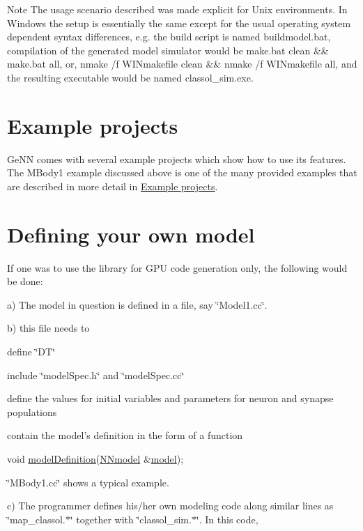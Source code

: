 \begin{DoxyNote}{Note}
The usage scenario described was made explicit for Unix environments. In Windows the setup is essentially the same except for the usual operating system dependent syntax differences, e.\+g. the build script is named buildmodel.\+bat, compilation of the generated model simulator would be {\ttfamily make.\+bat clean \&\& make.\+bat all}, or, {\ttfamily nmake /f W\+I\+Nmakefile clean \&\& nmake /f W\+I\+Nmakefile all}, and the resulting executable would be named {\ttfamily classol\+\_\+sim.\+exe}.
\end{DoxyNote}
\hypertarget{Quickstart_page_exs}{}\section{Example projects}\label{Quickstart_page_exs}
Ge\+N\+N comes with several example projects which show how to use its features. The M\+Body1 example discussed above is one of the many provided examples that are described in more detail in \hyperlink{Examples}{Example projects}.\hypertarget{Quickstart_page_ownmodel}{}\section{Defining your own model}\label{Quickstart_page_ownmodel}
If one was to use the library for G\+P\+U code generation only, the following would be done\+:

a) The model in question is defined in a file, say \char`\"{}\+Model1.\+cc\char`\"{}.

b) this file needs to 
\begin{DoxyEnumerate}
\item define \char`\"{}\+D\+T\char`\"{} 
\item include \char`\"{}model\+Spec.\+h\char`\"{} and \char`\"{}model\+Spec.\+cc\char`\"{} 
\item define the values for initial variables and parameters for neuron and synapse populations 
\item contain the model's definition in the form of a function 
\begin{DoxyCode}
\textcolor{keywordtype}{void} \hyperlink{tmp_2model_2MBody__userdef_8cc_a9aeaa0a22980484b2c472564fc9f686e}{modelDefinition}(\hyperlink{classNNmodel}{NNmodel} &\hyperlink{README_8txt_a69fd801b7213948c12d9dd7eebb3ed14}{model}); 
\end{DoxyCode}
 \char`\"{}\+M\+Body1.\+cc\char`\"{} shows a typical example. 
\end{DoxyEnumerate}c) The programmer defines his/her own modeling code along similar lines as \char`\"{}map\+\_\+classol.$\ast$\char`\"{} together with \char`\"{}classol\+\_\+sim.$\ast$\char`\"{}. In this code,


